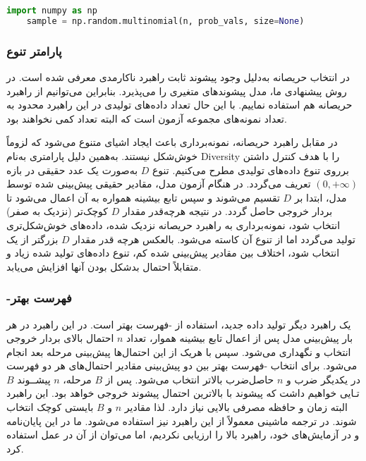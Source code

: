 \begin{LTR}
	\begin{lstlisting}[language=python, caption={\rl{نمونه‌برداری از توزیع چندجمله‌ای در پایتون.}}, label={codesnip3}]
	import numpy as np
	sample = np.random.multinomial(n, prob_vals, size=None) \end{lstlisting}
\end{LTR}

\subsubsection{پارامتر تنوع}\label{subsec:diversity}
در \cite{Godefroid:2017:LML:3155562.3155573} انتخاب حریصانه به‌دلیل وجود پیشوند ثابت راهبرد ناکارمدی معرفی شده است. در روش پیشنهادی ما، مدل پیشوند‌های متغیری را می‌پذیرد. بنابراین می‌توانیم از راهبرد حریصانه هم استفاده نماییم. با این حال تعداد داده‌های تولیدی در این راهبرد محدود به تعداد نمونه‌های مجموعه آزمون است که البته تعداد کمی نخواهند بود.

در مقابل راهبرد حریصانه، نمونه‌برداری باعث ایجاد اشیای متنوع می‌شود که لزوماً خوش‌شکل نیستند. به‌همین دلیل پارامتری به‌نام \gls{Diversity} را با هدف کنترل داشتن برروی تنوع داده‌های تولیدی مطرح می‌کنیم.  تنوع $D$ به‌صورت یک عدد حقیقی در بازه $(0,+\infty)$ تعریف می‌گردد. در هنگام آزمون مدل، مقادیر حقیقی پیش‌بینی شده توسط مدل، ابتدا بر $D$ تقسیم می‌شوند و سپس تابع بیشینه همواره به آن اعمال می‌شود تا بردار خروجی حاصل گردد. در نتیجه هرچه‌قدر مقدار $D$ کوچک‌تر (نزدیک به صفر) انتخاب شود، نمونه‌برداری به راهبرد حریصانه نزدیک شده، داده‌های خوش‌شکل‌تری تولید می‌گردد اما از تنوع آن کاسته می‌شود. بالعکس هرچه قدر مقدار $D$ بزرگتر از یک انتخاب شود، اختلاف بین مقادیر پیش‌بینی شده کم، تنوع داده‌های تولید شده زیاد و متقابلاً احتمال بد‌شکل بودن آنها افزایش می‌یابد.


\subsubsection{-فهرست بهتر}
یک راهبرد دیگر تولید داده جدید، استفاده از -فهرست بهتر است. در این راهبرد در هر بار پیش‌بینی مدل پس از اعمال تابع بیشینه هموار، تعداد $n$ احتمال بالای بردار خروجی انتخاب و نگهداری می‌شود. سپس با‌ هریک از این احتمال‌ها پیش‌بینی‌ مرحله بعد انجام می‌شود. برای انتخاب -فهرست بهتر بین دو پیش‌بینی مقادیر احتمال‌های هر دو فهرست در یکدیگر ضرب و $n$ حاصل‌ضرب بالاتر انتخاب می‌شود. پس از $B$ مرحله، $n$ پیشــوند $B$تـایی خواهیم داشت که پیشوند با بالاترین احتمال پیشوند خروجی خواهد بود. این راهبرد البته زمان و حافظه مصرفی بالایی نیاز دارد. لذا مقادیر $n$ و $B$ بایستی کوچک انتخاب شوند. در ترجمه ماشینی معمولاً از این راهبرد نیز استفاده می‌شود. ما در این پایان‌نامه و در آزمایش‌های خود، راهبرد بالا را ارزیابی نکردیم، اما می‌توان از آن در عمل استفاده کرد.  

